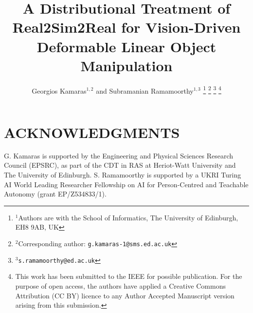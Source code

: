 \documentclass[letterpaper, 10 pt, journal]{ieeeconf}
\title{\LARGE \bf
A Distributional Treatment of Real2Sim2Real for Vision-Driven Deformable Linear Object Manipulation
}
\author{Georgios Kamaras$^{1,2}$ and Subramanian Ramamoorthy$^{1,3}$%
\thanks{$^{1}$Authors are with the School of Informatics, The University of Edinburgh, EH8 9AB, UK%
}
\thanks{$^{2}$Corresponding author: {\tt\small g.kamaras-1@sms.ed.ac.uk}%
}
\thanks{$^{3}${\tt\small s.ramamoorthy@ed.ac.uk}%
}
\thanks{This work has been submitted to the IEEE for possible publication. For the purpose of open access, the authors have applied a Creative Commons Attribution (CC BY) licence to any Author Accepted Manuscript version arising from this submission.}
}
\begin{document}
\maketitle
\thispagestyle{empty}
\pagestyle{empty}
















\section*{ACKNOWLEDGMENTS}

G. Kamaras is supported by the Engineering and Physical Sciences Research Council (EPSRC), as part of the CDT in RAS at Heriot-Watt University and The University of Edinburgh. S. Ramamoorthy is supported by a UKRI Turing AI World Leading Researcher Fellowship on AI for Person-Centred and Teachable Autonomy (grant EP/Z534833/1).




\end{document}
